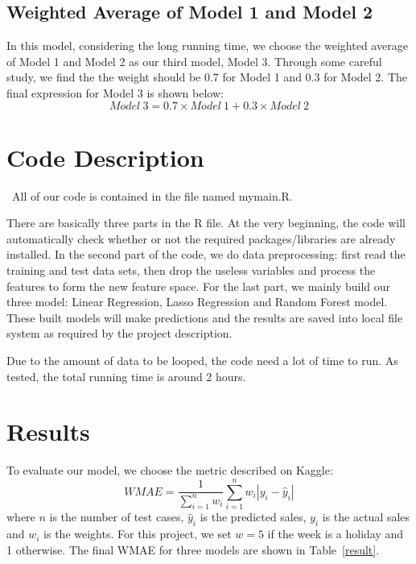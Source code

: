 \documentclass[12pt]{article}
\begin{document}
\subsection{Weighted Average of Model 1 and Model 2}
In this model, considering the long running time, we choose the weighted average of Model 1 and Model 2 as our third model, Model 3. Through some careful study, we find the the weight should be 0.7 for Model 1 and 0.3 for Model 2. The final expression for Model 3 is shown below:
\begin{equation}
Model \  3 = 0.7 \times Model \  1 + 0.3 \times Model \  2
\end{equation}


\section{Code Description}
\quad\ All of our code is contained in the file named mymain.R. 


There are basically three parts in the R file. At the very beginning, the code will automatically check whether or not the required packages/libraries are already installed. In the second part of the code, we do data preprocessing: first read the training and test data sets, then drop the useless variables and process the features to form the new feature space. For the last part, we mainly build our three model: Linear Regression, Lasso Regression and Random Forest model. These built models will make predictions and the results are saved into local file system as required by the project description.

Due to the amount of data to be looped, the code need a lot of time to run. As tested, the total running time is around 2 hours.

\section{Results}

To evaluate our model, we choose the metric described on Kaggle:
\begin{equation}
WMAE = \frac{1}{\sum_{i=1}^n w_i} \sum_{i=1}^n w_i | y_i - \hat{y}_i |
\end{equation}
where $n$ is the number of test cases, $\hat{y}_i$ is the predicted sales, $y_i$ is the actual sales and $w_i$ is the weights. For this project, we set $w=5$ if the week is a holiday and 1 otherwise. The final WMAE for three models are shown in Table~\ref{result}.
\end{document}
